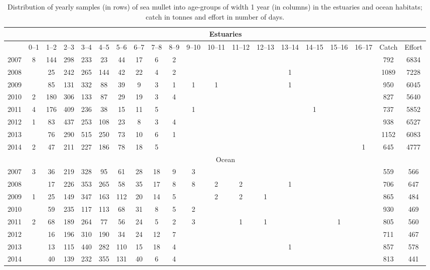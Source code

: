 \documentclass[12pt]{article}
\begin{document}
\begin{sidewaystable}[ht]
\tiny
\centering
\begin{tabular}{|l|c|c|c|c|c|c|c|c|c|c|c|c|c|c|c|c|c||c||c|}
\hline
& \multicolumn{19}{|c|}{Estuaries} \\
\hline
 & 0--1 & 1--2 & 2--3 & 3--4 & 4--5 & 5--6 & 6--7 & 7--8 & 8--9 & 9--10 & 10--11 & 11--12 & 12--13 & 13--14 & 14--15 & 15--16 & 16--17 & Catch & Effort \\ 
  \hline
2007 & 8 & 144 & 298 & 233 & 23 & 44 & 17 & 6 & 2 &  &  &  &  &  &  &  &  & 792 & 6834 \\ 
  2008 &  & 25 & 242 & 265 & 144 & 42 & 22 & 4 & 2 &  &  &  &  & 1 &  &  &  & 1089 & 7228 \\ 
  2009 &  & 85 & 131 & 332 & 88 & 39 & 9 & 3 & 1 & 1 & 1 &  &  & 1 &  &  &  & 950 & 6045 \\ 
  2010 & 2 & 180 & 306 & 133 & 87 & 29 & 19 & 3 & 4 &  &  &  &  &  &  &  &  & 827 & 5640 \\ 
  2011 & 4 & 176 & 409 & 236 & 38 & 15 & 11 & 5 &  & 1 &  &  &  &  & 1 &  &  & 737 & 5852 \\ 
  2012 & 1 & 83 & 437 & 253 & 108 & 23 & 8 & 3 & 4 &  &  &  &  &  &  &  &  & 938 & 6527 \\ 
  2013 &  & 76 & 290 & 515 & 250 & 73 & 10 & 6 & 1 &  &  &  &  &  &  &  &  & 1152 & 6083 \\ 
  2014 & 2 & 47 & 211 & 227 & 186 & 78 & 18 & 5 &  &  &  &  &  &  &  &  & 1 & 645 & 4777 \\ 
\hline
& \multicolumn{19}{|c|}{Ocean} \\
\hline
  2007 & 3 & 36 & 219 & 328 & 95 & 61 & 28 & 18 & 9 & 3 &  &  &  &  &  &  &  & 559 & 566 \\ 
  2008 &  & 17 & 226 & 353 & 265 & 58 & 35 & 17 & 8 & 8 & 2 & 2 &  & 1 &  &  &  & 706 & 647 \\ 
  2009 & 1 & 25 & 149 & 347 & 163 & 112 & 20 & 14 & 5 &  & 2 & 2 & 1 &  &  &  &  & 865 & 484 \\ 
  2010 &  & 59 & 235 & 117 & 113 & 68 & 31 & 8 & 5 & 2 &  &  &  &  &  &  &  & 930 & 469 \\ 
  2011 & 2 & 68 & 189 & 264 & 77 & 56 & 24 & 5 & 2 & 3 &  & 1 & 1 &  &  & 1 &  & 805 & 560 \\ 
  2012 &  & 16 & 196 & 310 & 190 & 34 & 24 & 12 & 7 &  &  &  &  &  &  &  &  & 711 & 467 \\ 
  2013 &  & 13 & 115 & 440 & 282 & 110 & 15 & 18 & 4 &  &  &  &  & 1 &  &  &  & 857 & 578 \\ 
  2014 &  & 40 & 139 & 232 & 355 & 131 & 40 & 6 & 4 &  &  &  &  &  &  &  &  & 813 & 441 \\ 
   \hline
\end{tabular}
\caption{Distribution of yearly samples (in rows) of sea mullet into age-groups of width 1 year (in columns) in the estuaries and ocean habitats; catch in tonnes and effort in number of days.} 
\label{tab:Mullet-NbAtAge}
\end{sidewaystable}
\end{document}
